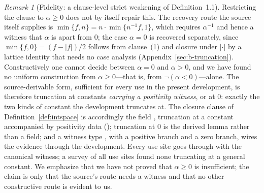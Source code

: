 \documentclass[11pt]{article}
\theoremstyle{definition}
\theoremstyle{remark}
\newtheorem{remark}[theorem]{Remark}
\begin{document}
\begin{remark}[Fidelity: a clause-level strict weakening of Definition~1.1]
Restricting the clause to $\alpha\ge0$ does not by itself repair this.  The recovery route the source itself supplies is $\min\{f,n\}=n\cdot\min\{n^{-1}f,1\}$, which requires $\alpha^{-1}$ and hence a witness that $\alpha$ is apart from $0$; the case $\alpha=0$ is recovered separately, since $\min\{f,0\}=(f-|f|)/2$ follows from clause~(1) and closure under $|\cdot|$ by a lattice identity that needs no case analysis (Appendix~\ref{sec:b-truncation}).  Constructively one cannot decide between $\alpha=0$ and $\alpha>0$, and we have found no uniform construction from $\alpha\ge0$---that is, from $\neg(\alpha<0)$---alone.  The source-derivable form, sufficient for every use in the present development, is therefore truncation at constants \emph{carrying a positivity witness}, or at $0$: exactly the two kinds of constant the development truncates at.  The closure clause of Definition~\ref{def:intspace} is accordingly the field , truncation at a constant accompanied by positivity data (); truncation at $0$ is the derived lemma  rather than a field; and a witness type , with a positive branch and a zero branch, wires the evidence through the development.  Every use site goes through with the canonical witness; a survey of all use sites found none truncating at a general constant.  We emphasize that we have not proved that $\alpha\ge0$ is insufficient; the claim is only that the source's route needs a witness and that no other constructive route is evident to us.


\end{remark}
\end{document}
